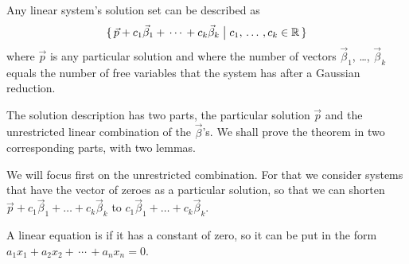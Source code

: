 \begin{theorem} \label{th:GenEqPartPlusHomo}
Any linear system's 
solution set can be described as 
\begin{equation*}
   \mbox{$\{\,\vec{p}+c_1\vec{\beta}_1+\,\cdots\,+c_k\vec{\beta}_k
     \bigm| c_1,\,\ldots\,,c_k\in\mathbb{R}\,\}$}
\end{equation*}
where \( \vec{p} \) is any particular solution  
and where the number of vectors 
$\vec{\beta}_1$, \ldots, $\vec{\beta}_k$ equals
the number of free variables that the system has after a Gaussian reduction.
\end{theorem}

The solution description has two parts, 
the particular solution $\vec{p}$ 
and the unrestricted linear combination of the $\vec{\beta}$'s.
We shall prove the theorem in two corresponding parts, with two lemmas.

We will focus first on the unrestricted combination.
For that we consider systems that have the vector of zeroes
as a particular solution, 
so that we can shorten $\vec{p}+c_1\vec{\beta}_1+\dots+c_k\vec{\beta}_k$
to $c_1\vec{\beta}_1+\dots+c_k\vec{\beta}_k$.

\begin{definition}
A linear equation is %
 if it has a constant of zero, so
it can be put in the form $a_1x_1+a_2x_2+\,\cdots\,+a_nx_n=0$.
\end{definition}


